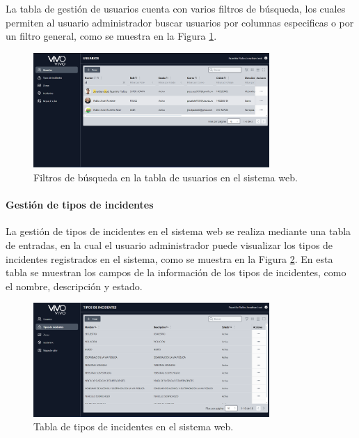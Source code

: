 La tabla de gestión de usuarios cuenta con varios filtros de búsqueda, los cuales permiten al usuario administrador buscar usuarios por
columnas especificas o por un filtro general, como se muestra en la Figura \ref{fig:filtros-tabla-usuarios-web}.

\begin{figure}[H]
    \centering
    \includegraphics[width=0.8\textwidth]{chapters/III-resultados-y-discusion/resources/images/filtros-tabla-usuarios-web.png}
    \caption{Filtros de búsqueda en la tabla de usuarios en el sistema web.}
    \label{fig:filtros-tabla-usuarios-web}
\end{figure}

\paragraph{Gestión de tipos de incidentes}
La gestión de tipos de incidentes en el sistema web se realiza mediante una tabla de entradas, en la cual el usuario administrador
puede visualizar los tipos de incidentes registrados en el sistema, como se muestra en la Figura \ref{fig:tabla-tipos-incidentes-web}.
En esta tabla se muestran los campos de la información de los tipos de incidentes, como el nombre, descripción y estado.

\begin{figure}[H]
    \centering
    \includegraphics[width=0.8\textwidth]{chapters/III-resultados-y-discusion/resources/images/tabla-tipos-incidentes-web.png}
    \caption{Tabla de tipos de incidentes en el sistema web.}
    \label{fig:tabla-tipos-incidentes-web}
\end{figure}

